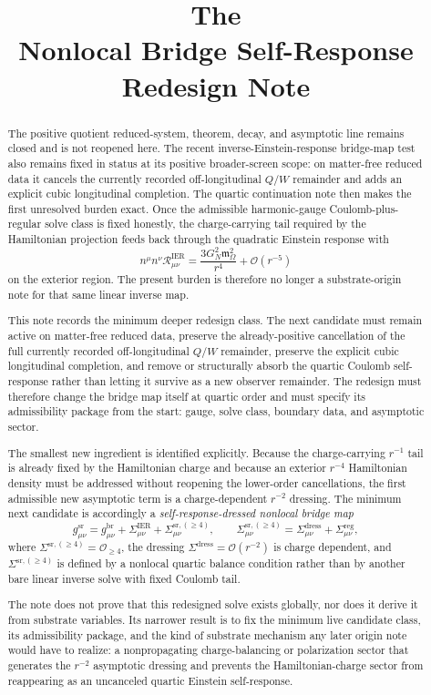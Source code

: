 \documentclass[11pt]{article}
\title{\textbf{The \TheoryName{}}\\[0.4em]
\large Nonlocal Bridge Self-Response Redesign Note}
\author{}
\date{}
\newcommand{\ReBridge}{g^{\mathrm{br}}}
\newcommand{\OpMetricSR}{g^{\mathrm{sr}}}
\newcommand{\SigmaIER}{\Sigma^{\mathrm{IER}}}
\newcommand{\SigmaSRFour}{\Sigma^{\mathrm{sr},(\ge 4)}}
\newcommand{\SigmaDress}{\Sigma^{\mathrm{dress}}}
\newcommand{\SigmaReg}{\Sigma^{\mathrm{reg}}}
\newcommand{\HamChargeOmega}{\mathfrak m_{\Omega}}
\begin{document}
\maketitle

\begin{abstract}
The positive quotient reduced-system, theorem, decay, and asymptotic line remains closed and is not reopened here. The recent inverse-Einstein-response bridge-map test also remains fixed in status at its positive broader-screen scope: on matter-free reduced data it cancels the currently recorded off-longitudinal \(Q/W\) remainder and adds an explicit cubic longitudinal completion. The quartic continuation note then makes the first unresolved burden exact. Once the admissible harmonic-gauge Coulomb-plus-regular solve class is fixed honestly, the charge-carrying tail required by the Hamiltonian projection feeds back through the quadratic Einstein response with
\[
n^\mu n^\nu \mathcal R_{\mu\nu}^{\mathrm{IER}}
=
\frac{3G_N^2\HamChargeOmega^2}{r^4}
+\mathcal O(r^{-5})
\]
on the exterior region. The present burden is therefore no longer a substrate-origin note for that same linear inverse map.

This note records the minimum deeper redesign class. The next candidate must remain active on matter-free reduced data, preserve the already-positive cancellation of the full currently recorded off-longitudinal \(Q/W\) remainder, preserve the explicit cubic longitudinal completion, and remove or structurally absorb the quartic Coulomb self-response rather than letting it survive as a new observer remainder. The redesign must therefore change the bridge map itself at quartic order and must specify its admissibility package from the start: gauge, solve class, boundary data, and asymptotic sector.

The smallest new ingredient is identified explicitly. Because the charge-carrying \(r^{-1}\) tail is already fixed by the Hamiltonian charge and because an exterior \(r^{-4}\) Hamiltonian density must be addressed without reopening the lower-order cancellations, the first admissible new asymptotic term is a charge-dependent \(r^{-2}\) dressing. The minimum next candidate is accordingly a \emph{self-response-dressed nonlocal bridge map}
\[
\OpMetricSR_{\mu\nu}
=
\ReBridge_{\mu\nu}
+\SigmaIER_{\mu\nu}
+\SigmaSRFour_{\mu\nu},
\qquad
\SigmaSRFour_{\mu\nu}
=
\SigmaDress_{\mu\nu}
+\SigmaReg_{\mu\nu},
\]
where \(\SigmaSRFour=\mathcal O_{\ge 4}\), the dressing \(\SigmaDress=\mathcal O(r^{-2})\) is charge dependent, and \(\SigmaSRFour\) is defined by a nonlocal quartic balance condition rather than by another bare linear inverse solve with fixed Coulomb tail.

The note does not prove that this redesigned solve exists globally, nor does it derive it from substrate variables. Its narrower result is to fix the minimum live candidate class, its admissibility package, and the kind of substrate mechanism any later origin note would have to realize: a nonpropagating charge-balancing or polarization sector that generates the \(r^{-2}\) asymptotic dressing and prevents the Hamiltonian-charge sector from reappearing as an uncanceled quartic Einstein self-response.
\end{abstract}
\end{document}
